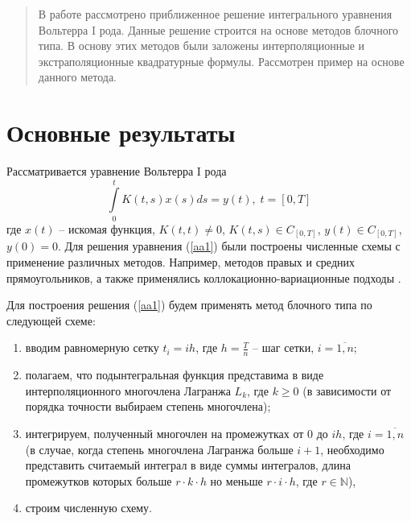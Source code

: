 \documentclass[12pt]{llncs}  %
\begin{document}
\maketitle

\begin{abstract}
В работе рассмотрено приближенное решение интегрального уравнения Вольтерра I рода. Данные решение строится на основе методов блочного типа. В основу этих методов были заложены интерполяционные и экстраполяционные квадратурные формулы. Рассмотрен пример на основе данного метода.

\end{abstract}

\section{Основные результаты} %

Рассматривается уравнение Вольтерра I рода
\begin{equation}\label{aa1}
\int\limits_0^t K(t,s)x(s)ds=y(t),\; t=[0,T]
\end{equation}
где $x(t)$ -- искомая функция, $K(t,t)\neq 0$, $K(t,s)\in C_{[0,T]}$, $y(t) \in C_{[0,T]}$, $y(0)=0$.
Для решения уравнения (\ref{aa1}) были построены численные схемы с применение различных методов. Например, методов правых \cite{Kar}  и средних \cite{Bul} прямоугольников, а также применялись коллокационно-вариационные подходы \cite{Bul_Mark}.


Для построения решения (\ref{aa1}) будем применять метод блочного типа по следующей схеме:
\begin{enumerate} 
  \item вводим равномерную сетку $t_i=ih$, где $h=\frac{T}{n}$ -- шаг сетки, $i=\overline{1,n}$;
  \item полагаем, что подынтегральная функция представима в виде интерполяционного многочлена Лагранжа $L_k$, где $k\geq 0$ (в зависимости от порядка точности выбираем степень многочлена);
  \item интегрируем, полученный многочлен на промежутках от $0$ до $ih$, где $i=\overline{1,n}$ (в случае, когда степень многочлена Лагранжа больше $i+1$, необходимо представить считаемый интеграл в виде суммы интегралов, длина промежутков которых  больше $r\cdot k\cdot h$ но меньше $r\cdot i\cdot h$, где $r \in \mathbb{N}$),
  \item строим численную схему.

\end{enumerate}
\end{document}
